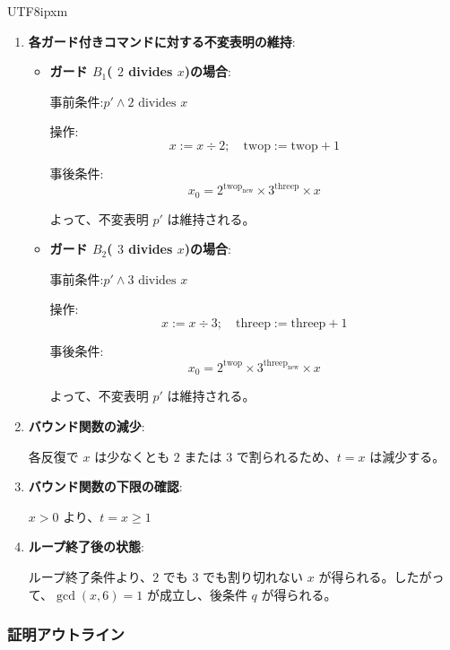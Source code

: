 \documentclass[12pt,a4paper]{article}
\begin{document}
\begin{CJK}{UTF8}{ipxm}
\begin{enumerate}
    初期条件 $p$ より、$p'$ は初期状態で成立する。

    \item \textbf{各ガード付きコマンドに対する不変表明の維持}:

    \begin{itemize}
        \item \textbf{ガード $B_1$(
$2$ divides $x$)の場合}:

        事前条件:$p' \land 2 \text{ divides } x$

        操作:
        \[
        x := x \div 2; \quad \text{twop} := \text{twop} + 1
        \]

        事後条件:
        \[
        x_0 = 2^{\text{twop}_{\text{new}}} \times 3^{\text{threep}} \times x
        \]

        よって、不変表明 $p'$ は維持される。

        \item \textbf{ガード $B_2$(
$3$ divides $x$)の場合}:

        事前条件:$p' \land 3 \text{ divides } x$

        操作:
        \[
        x := x \div 3; \quad \text{threep} := \text{threep} + 1
        \]

        事後条件:
        \[
        x_0 = 2^{\text{twop}} \times 3^{\text{threep}_{\text{new}}} \times x
        \]

        よって、不変表明 $p'$ は維持される。
    \end{itemize}

    \item \textbf{バウンド関数の減少}:

    各反復で $x$ は少なくとも $2$ または $3$ で割られるため、$t = x$ は減少する。

    \item \textbf{バウンド関数の下限の確認}:

    $x > 0$ より、$t = x \geq 1$

    \item \textbf{ループ終了後の状態}:

    ループ終了条件より、$2$ でも $3$ でも割り切れない $x$ が得られる。したがって、$\gcd(x, 6) = 1$ が成立し、後条件 $q$ が得られる。
\end{enumerate}

\subsubsection*{証明アウトライン}


\end{CJK}
\end{document}
